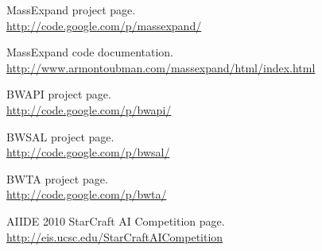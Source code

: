 
\nocite{*}

\begin{thebibliography}{99}

	MassExpand project page.\\
	\url{http://code.google.com/p/massexpand/}

	MassExpand code documentation.\\
	\url{http://www.armontoubman.com/massexpand/html/index.html}

	BWAPI project page.\\
	\url{http://code.google.com/p/bwapi/}

	BWSAL project page.\\
	\url{http://code.google.com/p/bwsal/}

	BWTA project page.\\
	\url{http://code.google.com/p/bwta/}

	AIIDE 2010 StarCraft AI Competition page.\\
	\url{http://eis.ucsc.edu/StarCraftAICompetition}

\end{thebibliography}